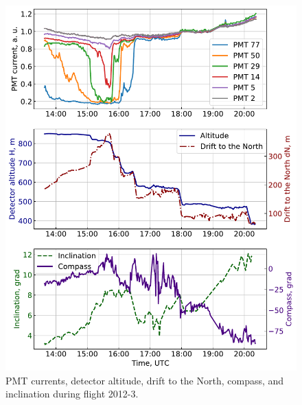 \documentclass[universe,article,submit,moreauthors,pdftex]{Definitions/mdpi}
\begin{document}
\begin{paracol}{2}
\begin{figure}[tb]
    \begin{minipage}[t]{0.48\textwidth}
        \centering
        \includegraphics[width=\textwidth]{2012-3_currents_H_dN.pdf}
        \caption{PMT currents, detector altitude, drift to the North, compass, and inclination during flight 2012-3.}
        \label{fig:2012-3_currents}
    \end{minipage}
    \hfill
    \begin{minipage}[t]{0.48\textwidth}
        \centering

\end{minipage}
\end{figure}
\end{paracol}
\end{document}
